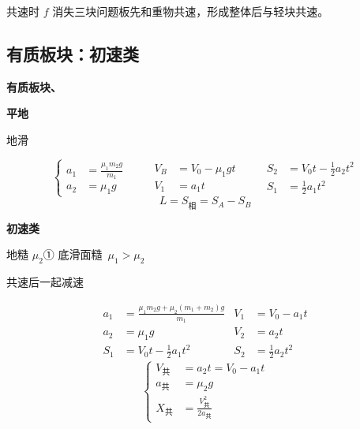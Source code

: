 \noindent 共速时 $f$ 消失\qquad 三块问题\qquad 板先和重物共速，形成整体后与轻块共速。

\subsection{有质板块：初速类}
\textbf{有质板块、}

\textbf{平地}

\noindent 地滑

\[
\left\{\begin{aligned}
a_1&=\frac{\mu_1m_2g}{m_1}\\
a_2&=\mu_1g
\end{aligned}\right.
\qquad
\begin{aligned}
V_B&=V_0-\mu_1gt\\
V_1&=a_1t
\end{aligned}
\qquad
\begin{aligned}
S_2&=V_0t-\frac12a_2t^2\\
S_1&=\frac12a_1t^2
\end{aligned}
\]%
\[
L=S_{\text{相}}=S_A-S_B
\]%

\textbf{初速类}

\noindent 地糙 $\mu_2$\quad ① 底滑面糙\ $\mu_1>\mu_2$

\noindent 共速后一起减速

\begin{align*}
a_1&=\frac{\mu_1m_2g+\mu_2(m_1+m_2)g}{m_1} & V_1&=V_0-a_1t\\
a_2&=\mu_1g & V_2&=a_2t\\
S_1&=V_0t-\frac12a_1t^2 & S_2&=\frac12a_2t^2
\end{align*}
\[
\left\{\begin{aligned}
V_{\text{共}}&=a_2t=V_0-a_1t\\
a_{\text{共}}&=\mu_2g\\
X_{\text{共}}&=\frac{V_{\text{共}}^2}{2a_{\text{共}}}
\end{aligned}\right.
\]

